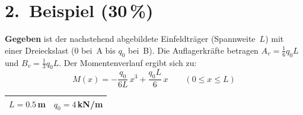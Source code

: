 \documentclass[a4paper,11pt]{article}
\begin{document}
\newpage
\section*{2.~Beispiel \hfill (30\,\%)}

\textbf{Gegeben} ist der nachstehend abgebildete Einfeldträger (Spannweite~$L$)
mit einer Dreieckslast (0 bei~A bis $q_0$ bei~B).
Die Auflagerkräfte betragen $A_v = \tfrac{1}{6}q_0 L$ und $B_v = \tfrac{1}{3}q_0 L$.
Der Momentenverlauf ergibt sich zu:
\[
  M(x) = -\frac{q_0}{6L}\,x^3 + \frac{q_0 L}{6}\,x
  \qquad (0 \le x \le L)
\]

\begin{tabular}{|c|c|}
\hline
$L = 0.5$\,m & $q_0 = 4$\,kN/m \\
\hline
\end{tabular}
\end{document}
